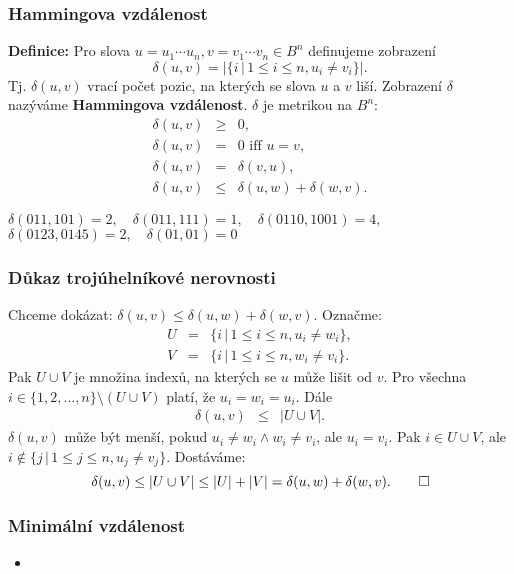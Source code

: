 \documentclass{beamer}
\newenvironment{definice}{\textbf{Definice:} }{}
\newcommand{\sep}{\,|\,}
\newenvironment{itemizex}%
  {\large \begin{itemize}%
    \setlength{\itemsep}{8pt}%
    \setlength{\parskip}{8pt}}%
  {\end{itemize}}
\begin{document}
\begin{frame}[t,fragile]\frametitle{Hammingova vzdálenost} 
    \begin{definice} Pro slova $u=u_1\cdots u_n, v=v_1\cdots v_n\in B^n$ definujeme zobrazení
    $$
    \delta(u,v) = |\{i\sep 1\le i \le n, u_i\ne v_i\}|.
    $$
    Tj. $\delta(u,v)$ vrací počet pozic, na kterých se slova $u$ a $v$ liší. Zobrazení $\delta$ nazýváme \textbf{Hammingova vzdálenost}. $\delta$ je metrikou na $B^n$:
    \begin{eqnarray*}
    \delta(u,v)&\ge&0,\\
    \delta(u,v)&=&0 \mbox{ iff } u=v,\\
    \delta(u,v)&=&\delta(v,u),\\
    \delta(u,v)&\le&\delta(u,w)+\delta(w,v).
    \end{eqnarray*}

    $\delta(011,101)=2, \quad \delta(011, 111)=1,\quad \delta(0110, 1001)=4,$ $\delta(0123, 0145)=2, \quad\delta(01,01)=0$
    \end{definice}
\end{frame}


\begin{frame}[t,fragile]\frametitle{Důkaz trojúhelníkové nerovnosti} 
Chceme dokázat: $\delta(u,v)\le\delta(u,w)+\delta(w,v)$. Označme:
\begin{eqnarray*}
U&=&\{i\sep 1\le i \le n, u_i\ne w_i\},\\
V&=&\{i\sep 1\le i \le n, w_i\ne v_i\}.
\end{eqnarray*}
Pak $U\cup V$ je množina indexů, na kterých se $u$ může lišit od $v$. Pro všechna $i\in \{1,2,\dots,n\}\setminus(U\cup V)$ platí, že $u_i=w_i=u_i$. Dále
\begin{eqnarray*}
\delta(u,v)&\le&|U\cup V|.
\end{eqnarray*}
$\delta(u,v)$ může být menší, pokud $u_i\ne w_i \wedge w_i\ne v_i$, ale $u_i=v_i$. Pak $i\in U\cup V$, ale $i\notin \{j\sep 1\le j \le n, u_j\ne v_j\}$. Dostáváme:
\begin{equation*}
    \delta(u,v)\le|U\cup V|\le|U|+|V|=\delta(u,w)+\delta(w,v).\qed
\end{equation*}
\end{frame}


\begin{frame}[t,fragile]\frametitle{Minimální vzdálenost} 
    \begin{itemizex}
        \item 
    \end{itemizex}
\end{frame}
\end{document}
